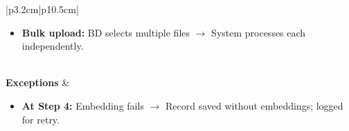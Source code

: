 \documentclass[a4paper]{article}
\begin{document}
\begin{table}[H]
\begin{tabular}{|p{3.2cm}|p{10.5cm}|}
\begin{minipage}[t]{\linewidth}
\begin{itemize}[nosep,leftmargin=*]
  \item \textbf{Bulk upload:} BD selects multiple files 
  $\rightarrow$ System processes each independently.
\end{itemize}
\end{minipage} \\
\hline
\textbf{Exceptions} &
\begin{minipage}[t]{\linewidth}
\begin{itemize}[nosep,leftmargin=*]
  \item \textbf{At Step 4:} Embedding fails $\rightarrow$ Record 
  saved without embeddings; logged for retry.
\end{itemize}
\end{minipage} \\
\hline
\end{tabular}
\end{table}
\end{document}
